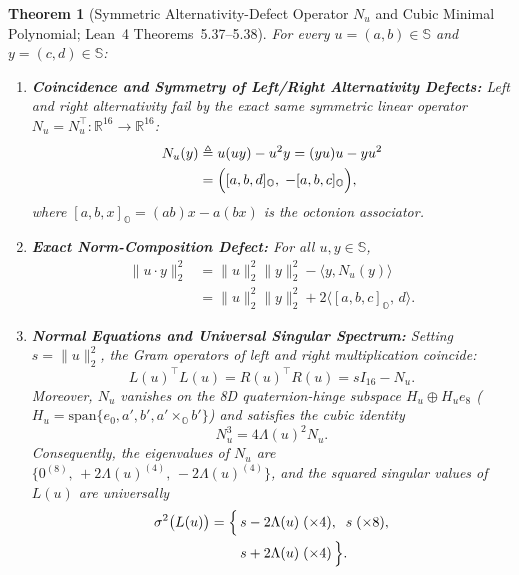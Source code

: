 \documentclass[journal,twoside]{IEEEtran}
\newtheorem{theorem}{Theorem}
\theoremstyle{definition}
\theoremstyle{remark}
\newcommand{\R}{\mathbb{R}}
\newcommand{\Oc}{\mathbb{O}}
\newcommand{\Se}{\mathbb{S}}
\begin{document}
\begin{theorem}[Symmetric Alternativity-Defect Operator $N_u$ and Cubic Minimal Polynomial; Lean~4 Theorems~5.37--5.38]
\label{thm:nu_cubic}
For every $u = (a, b) \in \Se$ and $y = (c, d) \in \Se$:
\begin{enumerate}
    \item \textbf{Coincidence and Symmetry of Left/Right Alternativity Defects:} Left and right alternativity fail by the exact same symmetric linear operator $N_u = N_u^\top : \R^{16} \to \R^{16}$:
    \begin{equation}
    \begin{aligned}
        N_u(y) &\triangleq u(uy) - u^2 y = (yu)u - y u^2 \\
               &= \Bigl([a, b, d]_{\Oc},\; -[a, b, c]_{\Oc}\Bigr),
    \end{aligned}
    \label{eq:nu_def}
    \end{equation}
    where $[a, b, x]_{\Oc} = (ab)x - a(bx)$ is the octonion associator.
    \item \textbf{Exact Norm-Composition Defect:} For all $u, y \in \Se$,
    \begin{equation}
    \begin{aligned}
        \|u \cdot y\|_2^2 &= \|u\|_2^2 \|y\|_2^2 - \langle y, N_u(y)\rangle \\
                          &= \|u\|_2^2 \|y\|_2^2 + 2\bigl\langle [a, b, c]_{\Oc},\, d\bigr\rangle.
    \end{aligned}
    \label{eq:norm_defect}
    \end{equation}
    \item \textbf{Normal Equations and Universal Singular Spectrum:} Setting $s = \|u\|_2^2$, the Gram operators of left and right multiplication coincide:
    \begin{equation}
        L(u)^\top L(u) = R(u)^\top R(u) = s I_{16} - N_u.
        \label{eq:gram_nu}
    \end{equation}
    Moreover, $N_u$ vanishes on the 8D quaternion-hinge subspace $H_u \oplus H_u e_8$ ($H_u = \mathrm{span}\{e_0, a', b', a'\times_{\Oc} b'\}$) and satisfies the cubic identity
    \begin{equation}
        N_u^3 = 4\Lambda(u)^2 N_u.
        \label{eq:nu_cubic}
    \end{equation}
    Consequently, the eigenvalues of $N_u$ are $\bigl\{0^{(8)},\, +2\Lambda(u)^{(4)},\, -2\Lambda(u)^{(4)}\bigr\}$, and the squared singular values of $L(u)$ are universally
    \begin{equation}
    \begin{aligned}
        \sigma^2\bigl(L(u)\bigr) = \Bigl\{\, &s - 2\Lambda(u)\;(\times 4),\;\; s\;(\times 8), \\
                                            &s + 2\Lambda(u)\;(\times 4)\,\Bigr\}.
    \end{aligned}
    \label{eq:singular_spectrum}
    \end{equation}
\end{enumerate}
\end{theorem}
\end{document}
